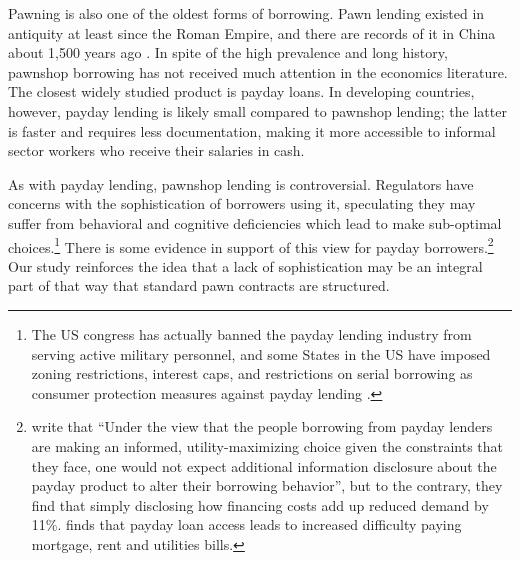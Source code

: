 \documentclass[oneside,11pt]{article}
\begin{document}
Pawning is also one of the oldest forms of borrowing. Pawn lending existed in antiquity at least since the Roman Empire, and there are records of it in China about 1,500 years ago \citep{PawnShops}. In spite of the high prevalence and long history, pawnshop borrowing has not received much attention in the economics literature. The closest widely studied product is payday loans. In developing countries, however, payday lending is likely small compared to pawnshop lending; the latter is faster and requires less documentation, making it more accessible to informal sector workers who receive their salaries in cash. %



As with payday lending, pawnshop lending is controversial. Regulators have concerns with the sophistication of borrowers using it, speculating they may suffer from behavioral and cognitive deficiencies which lead to make sub-optimal choices.\footnote{The US congress has actually banned the payday lending industry from serving active military personnel, and some States in the US have imposed zoning restrictions, interest caps, and restrictions on serial borrowing as consumer protection measures against payday lending \citep{Payday}.} There is some evidence in support of this view for payday borrowers.\footnote{\cite{Bertrand} write that ``Under the view that the people borrowing from payday lenders are making an informed, utility-maximizing choice given the constraints that they face, one would not expect additional information disclosure about the payday product to alter their borrowing behavior'', but to the contrary, they find that simply disclosing how financing costs add up reduced demand by 11\%. \cite{Meltzer} finds that payday loan access leads to increased difficulty paying mortgage, rent and utilities bills.}  Our study reinforces the idea that a lack of sophistication may be an integral part of that way that standard pawn contracts are structured.
\end{document}
